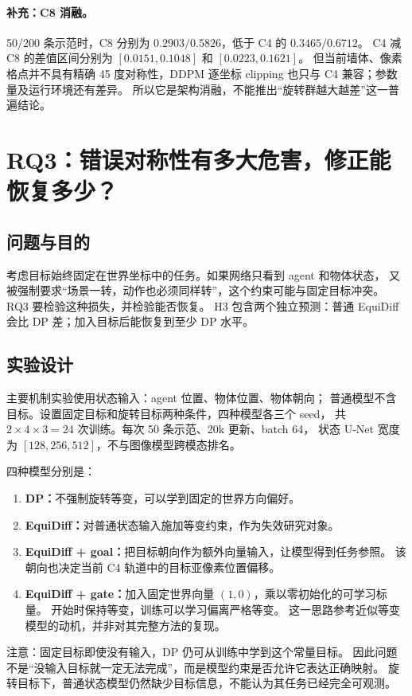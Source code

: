 \paragraph{补充：C8 消融。}
50/200 条示范时，C8 分别为 $0.2903/0.5826$，低于 C4 的 $0.3465/0.6712$。
C4 减 C8 的差值区间分别为 $[0.0151,0.1048]$ 和 $[0.0223,0.1621]$。
但当前墙体、像素格点并不具有精确 45 度对称性，DDPM 逐坐标 clipping
也只与 C4 兼容；参数量及运行环境还有差异。
所以它是架构消融，不能推出``旋转群越大越差''这一普遍结论。

\section{RQ3：错误对称性有多大危害，修正能恢复多少？}
\label{eqstudy:zh:rq3}
\subsection{问题与目的}
考虑目标始终固定在世界坐标中的任务。如果网络只看到 agent 和物体状态，
又被强制要求``场景一转，动作也必须同样转''，这个约束可能与固定目标冲突。
RQ3 要检验这种损失，并检验能否恢复。
H3 包含两个独立预测：普通 EquiDiff 会比 DP 差；加入目标后能恢复到至少 DP 水平。

\subsection{实验设计}
主要机制实验使用状态输入：agent 位置、物体位置、物体朝向；
普通模型不含目标。设置固定目标和旋转目标两种条件，四种模型各三个 seed，
共 $2\times4\times3=24$ 次训练。每次 50 条示范、20k 更新、batch 64，
状态 U-Net 宽度为 $[128,256,512]$，不与图像模型跨模态排名。

四种模型分别是：
\begin{enumerate}
\item \textbf{DP：}不强制旋转等变，可以学到固定的世界方向偏好。
\item \textbf{EquiDiff：}对普通状态输入施加等变约束，作为失效研究对象。
\item \textbf{EquiDiff + goal：}把目标朝向作为额外向量输入，让模型得到任务参照。
该朝向也决定当前 C4 轨道中的目标亚像素位置偏移。
\item \textbf{EquiDiff + gate：}加入固定世界向量 $(1,0)$，乘以零初始化的可学习标量。
开始时保持等变，训练可以学习偏离严格等变。
这一思路参考近似等变模型的动机\cite{wang2022approximately}，并非对其完整方法的复现。
\end{enumerate}

注意：固定目标即使没有输入，DP 仍可从训练中学到这个常量目标。
因此问题不是``没输入目标就一定无法完成''，而是模型约束是否允许它表达正确映射。
旋转目标下，普通状态模型仍然缺少目标信息，不能认为其任务已经完全可观测。

